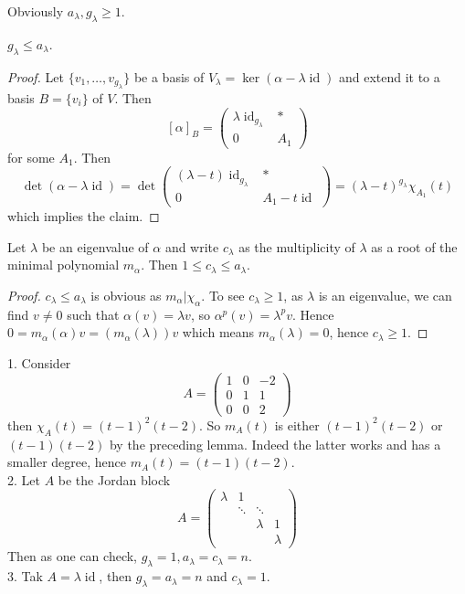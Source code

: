 \begin{remark}
    Obviously $a_\lambda,g_\lambda\ge 1$.
\end{remark}
\begin{lemma}\label{alg_geom_mult_ineq}
    $g_\lambda\le a_\lambda$.
\end{lemma}
\begin{proof}
    Let $\{v_1,\ldots,v_{g_\lambda}\}$ be a basis of $V_\lambda=\ker(\alpha-\lambda\operatorname{id})$ and extend it to a basis $B=\{v_i\}$ of $V$.
    Then
    $$[\alpha]_B=\begin{pmatrix}
        \lambda\operatorname{id}_{g_\lambda}&\ast\\
        0& A_1
    \end{pmatrix}$$
    for some $A_1$.
    Then
    $$\det(\alpha-\lambda\operatorname{id})=\det\begin{pmatrix}
        (\lambda-t)\operatorname{id}_{g_\lambda}&\ast\\
        0&A_1-t\operatorname{id}
    \end{pmatrix}=(\lambda-t)^{g_\lambda}\chi_{A_1}(t)$$
    which implies the claim.
\end{proof}
\begin{lemma}
    Let $\lambda$ be an eigenvalue of $\alpha$ and write $c_\lambda$ as the multiplicity of $\lambda$ as a root of the minimal polynomial $m_\alpha$.
    Then $1\le c_\lambda\le a_\lambda$.
\end{lemma}
\begin{proof}
    $c_\lambda\le a_\lambda$ is obvious as $m_\alpha|\chi_\alpha$.
    To see $c_\lambda\ge 1$, as $\lambda$ is an eigenvalue, we can find $v\neq 0$ such that $\alpha(v)=\lambda v$, so $\alpha^p(v)=\lambda^pv$.
    Hence $0=m_\alpha(\alpha)v=(m_\alpha(\lambda))v$ which means $m_\alpha(\lambda)=0$, hence $c_\lambda\ge 1$.
\end{proof}
\begin{example}
    1. Consider
    $$A=\begin{pmatrix}
        1&0&-2\\
        0&1&1\\
        0&0&2
    \end{pmatrix}$$
    then $\chi_A(t)=(t-1)^2(t-2)$.
    So $m_A(t)$ is either $(t-1)^2(t-2)$ or $(t-1)(t-2)$ by the preceding lemma.
    Indeed the latter works and has a smaller degree, hence $m_A(t)=(t-1)(t-2)$.\\
    2. Let $A$ be the Jordan block
    $$A=\begin{pmatrix}
        \lambda&1&&\\
        &\ddots&\ddots&\\
        &&\lambda&1\\
        &&&\lambda
    \end{pmatrix}$$
    Then as one can check, $g_\lambda=1,a_\lambda=c_\lambda=n$.\\
    3. Tak $A=\lambda\operatorname{id}$, then $g_\lambda=a_\lambda=n$ and $c_\lambda=1$.
\end{example}
